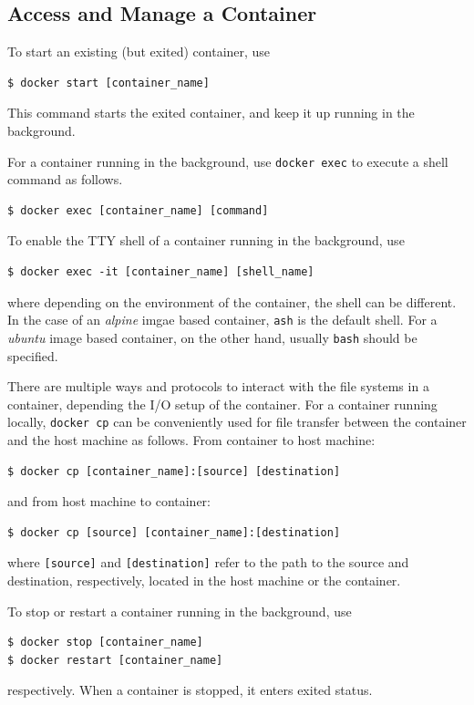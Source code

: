 \subsection{Access and Manage a Container}

To start an existing (but exited) container, use
\begin{lstlisting}
$ docker start [container_name]
\end{lstlisting}
This command starts the exited container, and keep it up running in the background.

For a container running in the background, use \verb|docker exec| to execute a shell command as follows.
\begin{lstlisting}
$ docker exec [container_name] [command]
\end{lstlisting}

To enable the TTY shell of a container running in the background, use
\begin{lstlisting}
$ docker exec -it [container_name] [shell_name]
\end{lstlisting}
where depending on the environment of the container, the shell can be different. In the case of an \textit{alpine} imgae based container, \verb|ash| is the default shell. For a \textit{ubuntu} image based container, on the other hand, usually \verb|bash| should be specified.

There are multiple ways and protocols to interact with the file systems in a container, depending the I/O setup of the container. For a container running locally, \verb|docker cp| can be conveniently used for file transfer between the container and the host machine as follows. From container to host machine:
\begin{lstlisting}
$ docker cp [container_name]:[source] [destination]
\end{lstlisting}
and from host machine to container:
\begin{lstlisting}
$ docker cp [source] [container_name]:[destination]
\end{lstlisting}
where \verb|[source]| and \verb|[destination]| refer to the path to the source and destination, respectively, located in the host machine or the container. 

To stop or restart a container running in the background, use
\begin{lstlisting}
$ docker stop [container_name]
$ docker restart [container_name]
\end{lstlisting}
respectively. When a container is stopped, it enters exited status.

